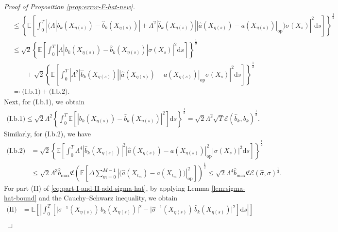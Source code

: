 \documentclass{article}
\theoremstyle{plain}
\theoremstyle{definition}
\theoremstyle{remark}
\renewcommand{\d}{\mathrm{d}}
\newcommand{\EE}{\mathbb{E}}
\newcommand{\calE}{\mathcal{E}}
\begin{document}
\begin{proof}[Proof of Proposition \ref{prop:error-F-hat-new}]
\begin{align}
   &\leq \left\{\!\EE \left[\int_{0}^T \!\!\left|\Big( \Lambda |b_k(X_{\eta(s)})-\widehat b_k(X_{\eta(s)})|\!+\!\Lambda^2|\widehat b_k(X_{\eta(s)})|\left|\widehat{a}(X_{\eta(s)})\!-\!a(X_{\eta(s)})\right|_{\mathrm{op}}\!\Big)\sigma(X_s)\right|^2 \!\d s \right]\!\right\}^{\frac{1}{2}}\nonumber\\
   &\leq\sqrt{2}\left\{\EE \left[\int_{0}^T \left|\Lambda |b_k(X_{\eta(s)})-\widehat b_k(X_{\eta(s)})|\sigma(X_s)\right|^2 \d s \right]\right\}^{\frac{1}{2}}\nonumber\\
   &\qquad +\sqrt{2}\left\{\EE \left[\int_{0}^T \left|\Lambda^2|\widehat b_k(X_{\eta(s)})|\left|\widehat{a}(X_{\eta(s)})-a(X_{\eta(s)})\right|_{\mathrm{op}}\sigma(X_s)\right|^2 \d s \right]\right\}^{\frac{1}{2}}\nonumber\\
   &\eqqcolon \text{(I.b.1)}+\text{(I.b.2)}.\nonumber
\end{align}
Next, for (I.b.1),  we obtain
\begin{align}
    \text{(I.b.1)}\leq \sqrt{2}\Lambda^2 \left\{    \int_{0}^T \EE \left[\left| b_k(X_{\eta(s)})-\widehat b_k(X_{\eta(s)})\right|^2\right]\d s \right\}^{\frac{1}{2}} = \sqrt{2}\Lambda^2  \sqrt{T} \calE(\widehat b_k, b_k)^{\frac{1}{2}}.\nonumber
\end{align}
Similarly, for (I.b.2), we have
\begin{align}
    \text{(I.b.2)}
    &=\sqrt{2}\left\{ \EE \left[\int_{0}^T \Lambda^4|\widehat b_k(X_{\eta(s)})|^2\left|\widehat{a}(X_{\eta(s)})-a(X_{\eta(s)})\right|_{\mathrm{op}}^2|\sigma(X_s)|^2 \d s \right]\right\}^{\frac{1}{2}}\nonumber\\
    &\leq \sqrt{2}\Lambda^3 \widehat b_{\max} \mathfrak{C}\left(\EE \left[\Delta\sum_{m=0}^{M-1}\left|\big( \widehat a(X_{t_m})-a(X_{t_m})\big)\right|_{\mathrm{op}}^2\right]\right)^{\frac{1}{2}}\leq \sqrt{2}\Lambda^{4} \widehat b_{\max} \mathfrak{C}\mathcal{E}(\widehat\sigma,\sigma)^{\frac{1}{2}}.
\end{align}
For part (II) of \eqref{eq:part-I-and-II-add-sigma-hat}, by applying Lemma \ref{lem:sigma-hat-bound} and the Cauchy–Schwarz inequality, we obtain 
\begin{align}
    \text{(II)} & = \EE \left[\left|\int_0^T \left[\big\lvert \sigma^{-1} (X_{\eta(s)})\,b_k(X_{\eta(s)}) \big\rvert^2-\big\lvert \widehat{\sigma}^{-1} (X_{\eta(s)})\,\widehat{b}_k(X_{\eta(s)}) \big\rvert^2\right]\d s\right|\right]\nonumber\\

\end{align}
\end{proof}
\end{document}
